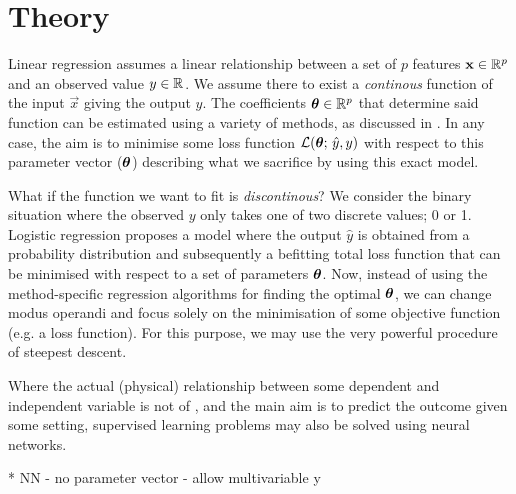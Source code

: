 \section{Theory}\label{sec:theory}

Linear regression assumes a linear relationship between a set of $p$ features $\vec{x}\in\RR[p]$ and an observed value $y\in\RR$. We assume there to exist a \textit{continous} function of the input $\vec{x}$ giving the output $\hat{y}$. The coefficients $\svec{\theta}\in\RR[p]$ that determine said function can be estimated using a variety of methods, as discussed in \projectOne. In any case, the aim is to minimise some loss function $\mathcal{L}(\svec{\theta};\,\hat{y}, y)$ with respect to this parameter vector ($\svec{\theta}$) describing what we sacrifice by using this exact model. 

What if the function we want to fit is \textit{discontinous}? We consider the binary situation where the observed $y$ only takes one of two discrete values; 0 or 1. Logistic regression proposes a model where the output $\hat{y}$ is obtained from  a probability distribution and subsequently a befitting total loss function that can be minimised with respect to a set of parameters $\svec{\theta}$. Now, instead of using the method-specific regression algorithms for finding the optimal $\svec{\theta}$, we can change modus operandi and focus solely on the minimisation of some objective function (e.g. a loss function). For this purpose, we may use the very powerful procedure of steepest descent.

Where the actual (physical) relationship between some dependent and independent variable is not of , and the main aim is to predict the outcome given some setting, supervised learning problems may also be solved using neural networks. 

\par{*} NN - no parameter vector - allow multivariable y




